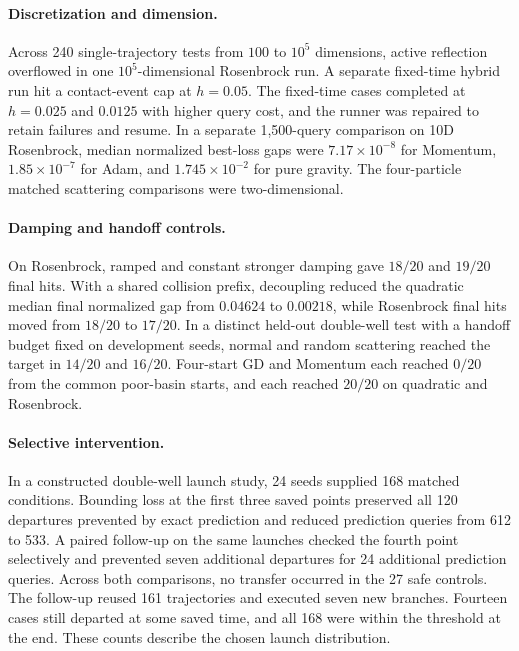 \documentclass[10pt,letterpaper]{article}
\begin{document}
\paragraph{Discretization and dimension.}
Across 240 single-trajectory tests from \(100\) to \(10^5\) dimensions, active reflection overflowed in one \(10^5\)-dimensional Rosenbrock run. A separate fixed-time hybrid run hit a contact-event cap at \(h=0.05\). The fixed-time cases completed at \(h=0.025\) and \(0.0125\) with higher query cost, and the runner was repaired to retain failures and resume. In a separate 1,500-query comparison on 10D Rosenbrock, median normalized best-loss gaps were \(7.17\times10^{-8}\) for Momentum, \(1.85\times10^{-7}\) for Adam, and \(1.745\times10^{-2}\) for pure gravity. The four-particle matched scattering comparisons were two-dimensional.

\paragraph{Damping and handoff controls.}
On Rosenbrock, ramped and constant stronger damping gave \(18/20\) and \(19/20\) final hits. With a shared collision prefix, decoupling reduced the quadratic median final normalized gap from \(0.04624\) to \(0.00218\), while Rosenbrock final hits moved from \(18/20\) to \(17/20\). In a distinct held-out double-well test with a handoff budget fixed on development seeds, normal and random scattering reached the target in \(14/20\) and \(16/20\). Four-start GD and Momentum each reached \(0/20\) from the common poor-basin starts, and each reached \(20/20\) on quadratic and Rosenbrock.

\paragraph{Selective intervention.}
In a constructed double-well launch study, 24 seeds supplied 168 matched conditions. Bounding loss at the first three saved points preserved all 120 departures prevented by exact prediction and reduced prediction queries from 612 to 533. A paired follow-up on the same launches checked the fourth point selectively and prevented seven additional departures for 24 additional prediction queries. Across both comparisons, no transfer occurred in the 27 safe controls. The follow-up reused 161 trajectories and executed seven new branches. Fourteen cases still departed at some saved time, and all 168 were within the threshold at the end. These counts describe the chosen launch distribution.
\end{document}
